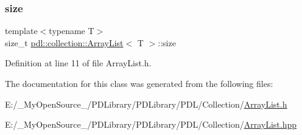 \subsubsection{\texorpdfstring{size}{size}}
{\footnotesize\ttfamily template$<$typename T$>$ \\
size\+\_\+t \mbox{\hyperlink{classpdl_1_1collection_1_1_array_list}{pdl\+::collection\+::\+Array\+List}}$<$ T $>$\+::size\hspace{0.3cm}{\ttfamily [private]}}



Definition at line 11 of file Array\+List.\+h.



The documentation for this class was generated from the following files\+:\begin{DoxyCompactItemize}
\item 
E\+:/\+\_\+\+My\+Open\+Source\+\_\+/\+P\+D\+Library/\+P\+D\+Library/\+P\+D\+L/\+Collection/\mbox{\hyperlink{_array_list_8h}{Array\+List.\+h}}\item 
E\+:/\+\_\+\+My\+Open\+Source\+\_\+/\+P\+D\+Library/\+P\+D\+Library/\+P\+D\+L/\+Collection/\mbox{\hyperlink{_array_list_8hpp}{Array\+List.\+hpp}}\end{DoxyCompactItemize}

